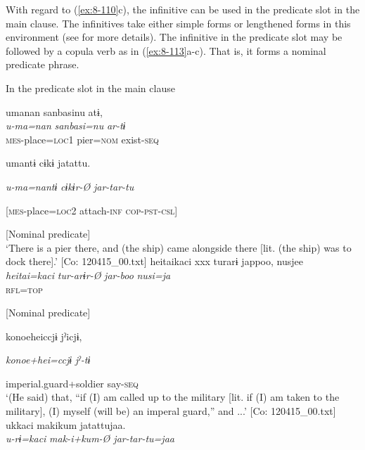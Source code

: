   With regard to (\ref{ex:8-110}c), the infinitive can be used in the predicate slot in the main clause. The infinitives take either simple forms or lengthened forms in this environment (see  for more details). The infinitive in the predicate slot may be followed by a copula verb as in (\ref{ex:8-113}a-c). That is, it forms a nominal predicate phrase.

\ea\label{ex:8-113}
  In the predicate slot in the main clause


{\TM}
\glll  umanan  sanbasinu  atɨ,\\
\textit{u-ma=nan}  \textit{sanbasi=nu}  \textit{ar-tɨ}\\
\textsc{mes}-place=\textsc{loc}1  pier=\textsc{nom}  exist-\textsc{seq}

      umantɨ  cɨkɨ  jatattu.

      \textit{u-ma=nantɨ}  \textit{cɨkɨr-Ø}  \textit{jar-tar-tu}

      [\textsc{mes}-place=\textsc{loc}2  attach-\textsc{inf}  \textsc{cop}-\textsc{pst}-\textsc{csl}]

      [Nominal predicate]\\
\glt ‘There is a pier there, and (the ship) came alongside there [lit. (the ship) was to dock there].’ [Co: 120415\_00.txt]
\ex
{\TM}
\glll  {\textbar}heitai{\textbar}kaci  xxx  turarɨ  jappoo,  nusjee\\
\textit{heitai=kaci}    \textit{tur-arɨr-Ø}  \textit{jar-boo}  \textit{nusi=ja}\\
[soldier=\textsc{all}    take-\textsc{pass}-\textsc{inf}  \textsc{cop}-\textsc{cnd}]  \textsc{rfl}=\textsc{top}

      [Nominal predicate]  

      {\textbar}konoehei{\textbar}ccjɨ  jˀicjɨ,  

      \textit{konoe+hei=ccjɨ}  \textit{jˀ-tɨ}  

      imperial.guard+soldier  say-\textsc{seq}\\
\glt ‘(He said) that, “if (I) am called up to the military [lit. if (I) am taken to the military], (I) myself (will be) an imperal guard,” and ...’ [Co: 120415\_00.txt]
\ex
{\TM}
\glll  ukkaci  makikum  jatattujaa.\\
\textit{u-rɨ=kaci}  \textit{mak-i+kum-Ø  jar-tar-tu=jaa}\\
[\textsc{mes}-\textsc{nlz}=\textsc{all}  roll-\textsc{inf}+into-\textsc{inf}  \textsc{cop}-\textsc{pst}-\textsc{csl}=\textsc{sol}]

